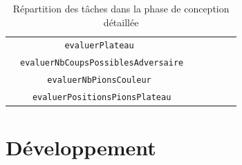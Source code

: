 \documentclass[11pt]{report}
\begin{document}
\begin{table}[h]
\begin{center}
\begin{tabular}{|c|c|c|c|c|c|c|}
				 & \tt{evaluerPlateau} &  & &  & \cellcolor{lightgray} & \\\cline{2-7}
				 & {\footnotesize\tt{evaluerNbCoupsPossiblesAdversaire}} &  & &  & \cellcolor{lightgray} & \\\cline{2-7}
				 & \tt{evaluerNbPionsCouleur} &  & &  & \cellcolor{lightgray} & \\\cline{2-7}
				 & {\small\tt{evaluerPositionsPionsPlateau}} &  & &  & \cellcolor{lightgray} & \\\hline
\end{tabular}
\end{center}
\caption{Répartition des tâches dans la phase de conception détaillée}
\end{table}

\chapter{Développement}
\end{document}
